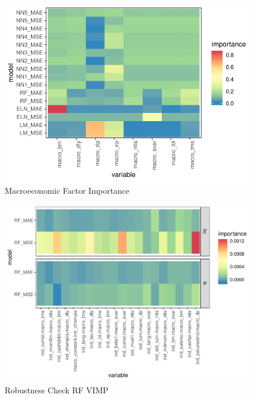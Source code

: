 \documentclass{article}
\begin{document}
\begin{figure}
	\includegraphics[]{../../Results/empirical/empirical_sample_all_vi_macro.pdf}
	\caption{Macroeconomic Factor Importance}
\end{figure}


\begin{figure}
	\includegraphics[]{../../Results/empirical/empirical_vimp.pdf}
	\caption{Robustness Check RF VIMP}
\end{figure}



\FloatBarrier
\end{document}
